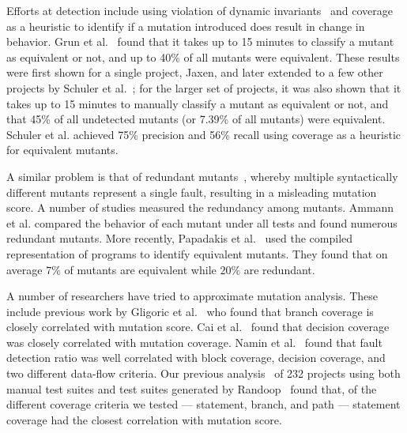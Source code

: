 \documentclass[conference]{IEEEtran}
\begin{document}
Efforts at detection include using violation of dynamic invariants~\cite{schuler2009efficient}
and coverage~\cite{schuler2013covering,grun2009the} as a
heuristic to identify if a mutation introduced does result in change in
behavior. Grun et al.~\cite{grun2009the} found that it takes up to
15 minutes to classify a mutant as equivalent or not, and up to 40\% of
all mutants were equivalent.  These results were first shown for a single project,
Jaxen, and later extended to a few other projects by
Schuler et al.~\cite{schuler2013covering}; for the larger set of
projects, it was also shown that it takes up to
15 minutes to manually classify a mutant as equivalent or not, and that 45\% of
all undetected mutants (or 7.39\% of all mutants) were
equivalent. Schuler et al.
achieved 75\% precision and 56\% recall using coverage as a heuristic for
equivalent mutants.

A similar problem is that of redundant mutants~\cite{just2012doredundant},
whereby multiple syntactically different mutants represent a single fault,
resulting in a misleading mutation score. A number of studies measured the
redundancy among mutants. Ammann et al. \cite{ammann2014establishing} compared
the behavior of each mutant under all tests and found numerous
redundant mutants.  More recently, Papadakis et al.~\cite{papadakis2015trivial}
used the compiled representation of programs to identify equivalent mutants.
They found that on average $7\%$ of mutants are equivalent while $20\%$
are redundant.

A number of researchers have tried to approximate mutation analysis. These
include previous work by  Gligoric et al.~\cite{gligoric2013comparing} who
found that branch coverage is closely correlated with mutation score. 
Cai et al.~\cite{cai2005effect} found that decision coverage was closely
correlated with mutation coverage. Namin et al.~\cite{namin2009influence}
found that fault detection ratio was well correlated with block coverage,
decision coverage, and two different data-flow criteria. Our previous
analysis~\cite{gopinath2014code} of 232 projects using both manual test suites
and test suites generated by Randoop~\cite{randoop} found that, of the different coverage
criteria we tested --- statement, branch, and path  --- statement coverage had the
closest correlation with mutation score.
\end{document}
